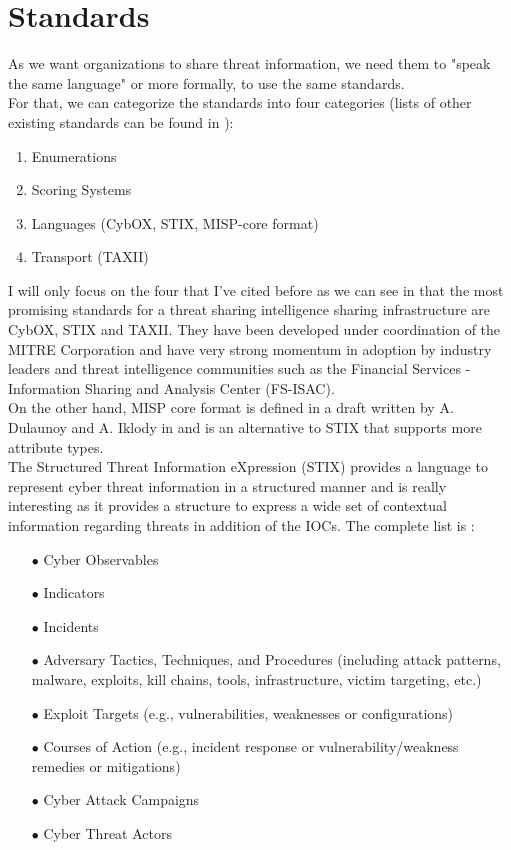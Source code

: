 \documentclass{eplmastersthesis}
\begin{document}
\section{Standards}
As we want organizations to share threat information, we need them to "speak the same language" or more formally, to use the same standards.\\
For that, we can categorize the standards into four categories (lists of other existing standards can be found in \cite{AwesomeTreat, mohaisen2017rethinking}):
\begin{enumerate}
\item Enumerations
\item Scoring Systems
\item Languages (CybOX, STIX, MISP-core format)
\item Transport (TAXII)
\end{enumerate}

I will only focus on the four that I've cited before as we can see in \cite{fransen2015cyber, sauerwein2017threat} that the most promising standards for a threat sharing intelligence sharing infrastructure are CybOX, STIX and TAXII. They have been developed under coordination of the MITRE Corporation and have very strong momentum in adoption by industry leaders and threat intelligence communities such as the Financial Services - Information Sharing and Analysis Center (FS-ISAC).\\
On the other hand, MISP core format is defined in a draft written by A. Dulaunoy and A. Iklody in \cite{MispDraft} and is an alternative to STIX that supports more attribute types.\\
The  Structured Threat Information eXpression (STIX) \cite{barnum2012standardizing} provides a language to represent cyber threat information in a structured manner and is really interesting as it provides a structure to express a wide set of contextual information regarding threats in addition of the IOCs. The complete list is :

\begin{itemize}
\item[$\bullet$] Cyber Observables
\item[$\bullet$] Indicators
\item[$\bullet$] Incidents
\item[$\bullet$] Adversary Tactics, Techniques, and Procedures (including attack patterns, malware, exploits, kill
chains, tools, infrastructure, victim targeting, etc.)
\item[$\bullet$] Exploit Targets (e.g., vulnerabilities, weaknesses or configurations)
\item[$\bullet$] Courses of Action (e.g., incident response or vulnerability/weakness remedies or mitigations)
\item[$\bullet$] Cyber Attack Campaigns
\item[$\bullet$] Cyber Threat Actors
\end{itemize}
\end{document}
